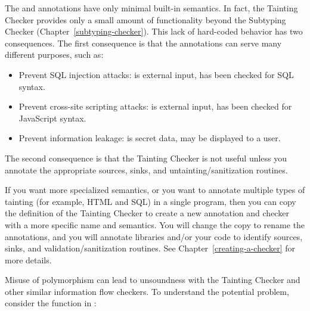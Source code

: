 
The  and  annotations have only minimal
built-in semantics.  In fact, the Tainting Checker provides only a small
amount of functionality beyond the Subtyping Checker
(Chapter~\ref{subtyping-checker}).  This lack of hard-coded behavior has
two consequences.  The first consequence is that
the annotations can serve many different purposes, such as:

\begin{itemize}
\item
  Prevent SQL injection attacks:   is external input,
   has been checked for SQL syntax.
\item
  Prevent cross-site scripting attacks:   is external input,
   has been checked for JavaScript syntax.
\item
  Prevent information leakage:   is secret data,
   may be displayed to a user.
\end{itemize}

The second consequence is that the Tainting Checker is not useful unless
you annotate the appropriate sources, sinks, and untainting/sanitization
routines.


If you want more specialized semantics, or you want to annotate multiple
types of tainting (for example, HTML and SQL) in a single program,
then you can copy the definition of
the Tainting Checker to create a new annotation and checker with a more
specific name and semantics.  You will change the copy to rename the
annotations, and you will annotate libraries and/or your code to identify
sources, sinks, and validation/sanitization routines.
See Chapter~\ref{creating-a-checker} for more
details.



Misuse of polymorphism can lead to unsoundness with the Tainting Checker
and other similar information flow checkers. To understand the potential
problem, consider the  function in
:

